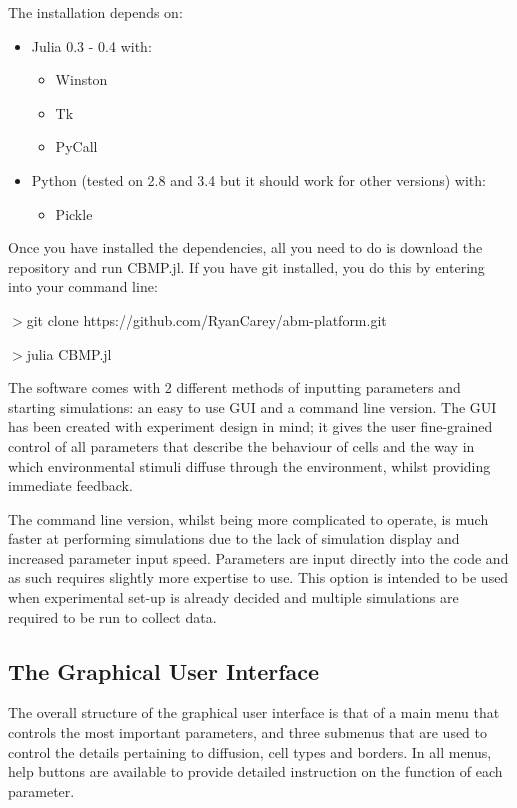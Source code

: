 \documentclass[11.5pt]{article}
\begin{document}
The installation depends on:

\begin{itemize}
\item Julia 0.3 - 0.4 with:
\begin{itemize}
\item Winston
\item Tk
\item PyCall
\end{itemize}
\item Python (tested on 2.8 and 3.4 but it should work for other 
versions) with:
\begin{itemize}
\item Pickle
\end{itemize}
\end{itemize}


Once you have installed the dependencies, all you need to do is download 
the repository and run CBMP.jl. If you have git installed, you do this 
by entering into your command line:

{\fontsize{11pt}{11pt} \ttfamily
$>$git clone https://github.com/RyanCarey/abm-platform.git

$>$julia CBMP.jl}




The software comes with 2 different methods of inputting parameters and 
starting simulations: an easy to use GUI and a command line version. The 
GUI has been created with experiment design in mind; it gives the user 
fine-grained control of all parameters that describe the behaviour of 
cells and the way in which environmental stimuli diffuse through the 
environment, whilst providing immediate feedback.



The command line version, whilst being more complicated to operate, is 
much faster at performing simulations due to the lack of simulation 
display and increased parameter input speed. Parameters are input 
directly into the code and as such requires slightly more expertise to 
use. This option is intended to be used when experimental set-up is 
already decided and multiple simulations are required to be run to 
collect data.



\subsection{The Graphical User Interface}
The overall structure of the graphical user interface is that of a main 
menu that controls the most important parameters, and three submenus 
that are used to control the details pertaining to diffusion, cell types 
and borders. In all menus, help buttons are available to provide 
detailed instruction on the function of each parameter.
\end{document}

